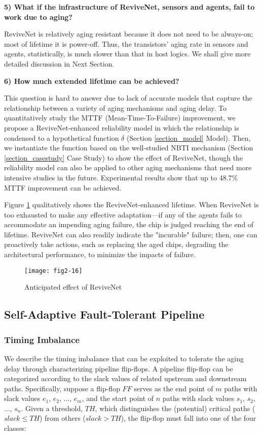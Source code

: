 {\bf 5) What if the infrastructure of ReviveNet, sensors and agents, fail to work due to aging?}

ReviveNet is relatively aging resistant because it does not need to be always-on; most of lifetime it is power-off. Thus, the transistors' aging rate in sensors and agents, statistically, is much slower than that in host logics. We shall give more detailed discussion in Next Section.


{\bf 6) How much extended lifetime can be achieved?}

This question is hard to answer due to lack of accurate models that capture the relationship between a variety of aging mechanisms and aging delay. To quantitatively study the MTTF (Mean-Time-To-Failure) improvement, we propose a ReviveNet-enhanced  reliability model in which the relationship is condensed to a hypothetical function $\delta$ (Section \ref{section_model} Model). Then, we instantiate the function based on the well-studied NBTI mechanism (Section \ref{section_casestudy} Case Study) to show the effect of ReviveNet, though the reliability model can also be applied to other aging mechanisms that need more intensive studies in the future. Experimental results show that up to 48.7\% MTTF improvement can be achieved.


Figure \ref{curve} qualitatively shows the ReviveNet-enhanced lifetime. When ReviveNet is too exhausted to make any effective adaptation---if any of the agents fails to accommodate an impending aging failure, the chip is judged reaching the end of lifetime. ReviveNet can also readily indicate the "incurable" failure; then, one can proactively take actions, such as replacing the aged chips, degrading the architectural performance, to minimize the impacts of failure.


\begin{figure}[t]
\centering
\texttt{[image: fig2-16]}%
   \caption{Anticipated effect of ReviveNet}\label{curve}
\end{figure}

\subsection{Self-Adaptive Fault-Tolerant Pipeline}
\subsubsection{Timing Imbalance}
We describe the timing imbalance that can be exploited to tolerate the aging delay through characterizing pipeline flip-flops. A pipeline flip-flop can be categorized according to the slack values of related upstream and downstream paths. Specifically, suppose a flip-flop $FF$ serves as the end point of $m$ paths with slack values $e_1$, $e_2$, $\ldots$, $e_m$, and the start point of $n$ paths with slack values $s_1$, $s_2$, $\ldots$, $s_n$. Given a threshold, $TH$, which distinguishes the (potential) critical paths ($slack \leq TH$) from others ($slack > TH$), the flip-flop must fall into one of the four classes:

